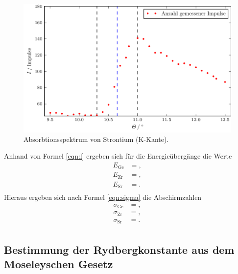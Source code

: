 \begin{figure}
  \centering
  \includegraphics{build/plot_sr.pdf}
  \caption{Absorbtionsspektrum von Strontium (K-Kante).}
  \label{fig:plot6}
\end{figure}

Anhand von Formel \eqref{eqn:l} ergeben sich für die Energieübergänge die Werte
\begin{align*}
  E_\text{Ge} &= , \\
  E_\text{Zr} &= , \\
  E_\text{Sr} &= . \\
\end{align*}
Hieraus ergeben sich nach Formel \eqref{eqn:sigma} die Abschirmzahlen
\begin{align*}
  \sigma_\text{Ge} &= , \\
  \sigma_\text{Zr} &= , \\
  \sigma_\text{Sr} &= . \\
\end{align*}

\subsection{Bestimmung der Rydbergkonstante aus dem Moseleyschen Gesetz}
